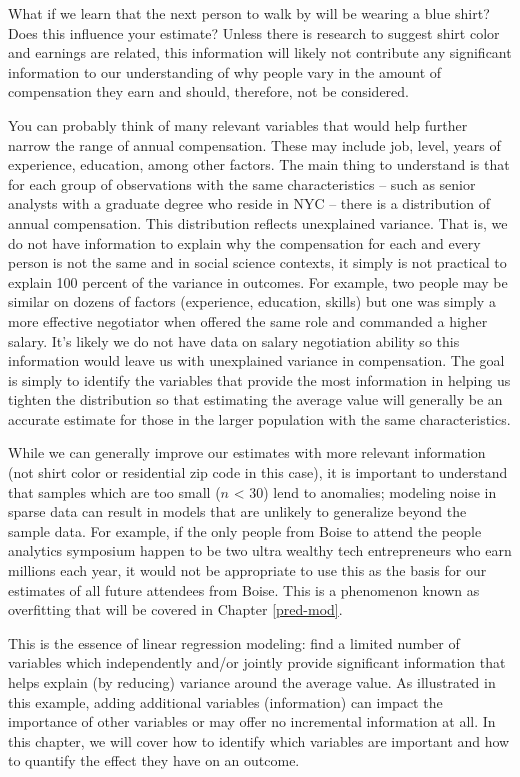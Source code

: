 \documentclass[
]{book}
\begin{document}
What if we learn that the next person to walk by will be wearing a blue shirt? Does this influence your estimate? Unless there is research to suggest shirt color and earnings are related, this information will likely not contribute any significant information to our understanding of why people vary in the amount of compensation they earn and should, therefore, not be considered.

You can probably think of many relevant variables that would help further narrow the range of annual compensation. These may include job, level, years of experience, education, among other factors. The main thing to understand is that for each group of observations with the same characteristics -- such as senior analysts with a graduate degree who reside in NYC -- there is a distribution of annual compensation. This distribution reflects unexplained variance. That is, we do not have information to explain why the compensation for each and every person is not the same and in social science contexts, it simply is not practical to explain 100 percent of the variance in outcomes. For example, two people may be similar on dozens of factors (experience, education, skills) but one was simply a more effective negotiator when offered the same role and commanded a higher salary. It's likely we do not have data on salary negotiation ability so this information would leave us with unexplained variance in compensation. The goal is simply to identify the variables that provide the most information in helping us tighten the distribution so that estimating the average value will generally be an accurate estimate for those in the larger population with the same characteristics.

While we can generally improve our estimates with more relevant information (not shirt color or residential zip code in this case), it is important to understand that samples which are too small (\(n\) \textless{} 30) lend to anomalies; modeling noise in sparse data can result in models that are unlikely to generalize beyond the sample data. For example, if the only people from Boise to attend the people analytics symposium happen to be two ultra wealthy tech entrepreneurs who earn millions each year, it would not be appropriate to use this as the basis for our estimates of all future attendees from Boise. This is a phenomenon known as overfitting that will be covered in Chapter \ref{pred-mod}.

This is the essence of linear regression modeling: find a limited number of variables which independently and/or jointly provide significant information that helps explain (by reducing) variance around the average value. As illustrated in this example, adding additional variables (information) can impact the importance of other variables or may offer no incremental information at all. In this chapter, we will cover how to identify which variables are important and how to quantify the effect they have on an outcome.
\end{document}
